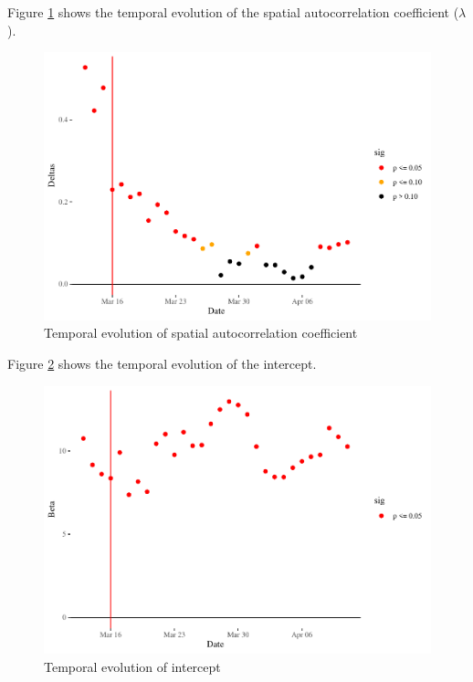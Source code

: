 \documentclass[]{elsarticle} %
\makeatletter
\def\maxwidth{\ifdim\Gin@nat@width>\linewidth\linewidth
\else\Gin@nat@width\fi}
\let\Oldincludegraphics\includegraphics
\renewcommand{\includegraphics}[1]{\Oldincludegraphics[width=\maxwidth]{#1}}
\makeatother
\begin{document}
Figure \ref{fig:delta-time} shows the temporal evolution of the spatial
autocorrelation coefficient (\(\lambda\)).

\begin{figure}
\centering
\includegraphics{Environmental-Correlates-of-COVID19-Spain_files/figure-latex/delta-time-1.pdf}
\caption{\label{fig:delta-time}Temporal evolution of spatial
autocorrelation coefficient}
\end{figure}

Figure \ref{fig:beta-intercept-time} shows the temporal evolution of the
intercept.

\begin{figure}
\centering
\includegraphics{Environmental-Correlates-of-COVID19-Spain_files/figure-latex/beta-intercept-time-1.pdf}
\caption{\label{fig:beta-intercept-time}Temporal evolution of intercept}
\end{figure}
\end{document}
